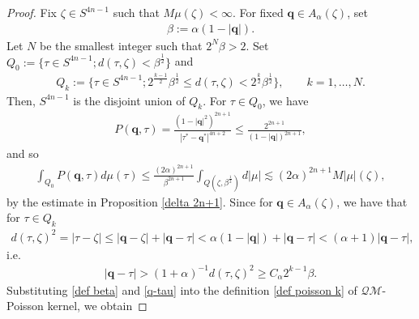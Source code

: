 \documentclass[a4paper,11pt]{amsart}
\numberwithin{equation}{section}
\begin{document}
\begin{proof}
Fix $\zeta\in S^{4n-1}$ such that $M\mu(\zeta)<\infty$. For fixed $\mathbf{q}\in A_{\alpha}(\zeta)$,
set
\begin{equation}\begin{aligned}\label{def beta}
\beta:=\alpha(1-|\mathbf{q}|).
\end{aligned}\end{equation}
Let $N$ be the smallest integer such that $2^N\beta>2$.
Set $Q_0:=\{\tau\in S^{4n-1};d(\tau,\zeta)<\beta^{\frac12}\}$ and
\begin{equation*}\begin{aligned}
Q_k:=\{\tau\in S^{4n-1};2^{\frac{k-1}{2}}\beta^{\frac12}\leq d(\tau,\zeta)<2^\frac{k}{2}\beta^{\frac12}\},\quad \quad k=1,\dots,N.
\end{aligned}\end{equation*}
Then, $S^{4n-1}$ is the disjoint union of $Q_k$. For $\tau\in Q_0$, we have
\begin{equation*}\begin{aligned}
P(\mathbf{q},\tau)=\frac{(1-|\mathbf{q}|^2)^{2n+1}}{|\tau^*-\mathbf{q}^*|^{4n+2}}\leq\frac{2^{2n+1}}{(1-|\mathbf{q}|)^{2n+1}},
\end{aligned}\end{equation*}
and so
\begin{equation}\begin{aligned}\label{estimate 1}
\int_{Q_0}P(\mathbf{q},\tau)d\mu(\tau)\leq\frac{(2\alpha)^{2n+1}}{\beta^{2n+1}}\int_{Q(\zeta,\beta^{\frac12})}d|\mu|\lesssim (2\alpha)^{2n+1}M|\mu|(\zeta),
\end{aligned}\end{equation}
by the estimate in Proposition \ref{delta 2n+1}.
Since for $\mathbf{q}\in A_{\alpha}(\zeta)$, we have that for $\tau\in Q_k$
\begin{equation}\begin{aligned}\label{eta-zeta}
d(\tau,\zeta)^2=|\tau-\zeta|\leq|\mathbf{q}-\zeta|+|\mathbf{q}-\tau|<\alpha(1-|\mathbf{q}|)+|\mathbf{q}-\tau|<(\alpha+1)|\mathbf{q}-\tau|,
\end{aligned}\end{equation}
i.e.
\begin{equation}\begin{aligned}\label{q-tau}
|\mathbf{q}-\tau|>(1+\alpha)^{-1}d(\tau,\zeta)^2\geq C_{\alpha}2^{k-1}\beta.
\end{aligned}\end{equation}
Substituting \eqref{def beta} and \eqref{q-tau} into the definition \eqref{def poisson k} of $\mathcal{QM}$-Poisson kernel, we obtain

\end{proof}
\end{document}
